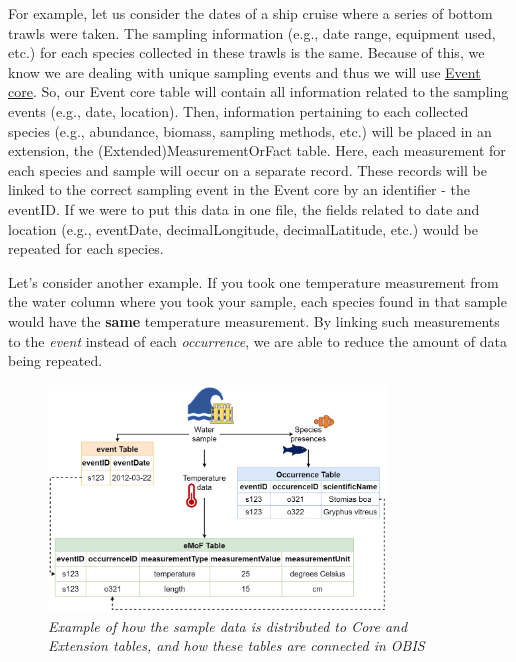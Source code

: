 \documentclass[
  letterpaper,
  DIV=11,
  numbers=noendperiod,
  oneside]{scrreprt}
\begin{document}
For example, let us consider the dates of a ship cruise where a series
of bottom trawls were taken. The sampling information (e.g., date range,
equipment used, etc.) for each species collected in these trawls is the
same. Because of this, we know we are dealing with unique sampling
events and thus we will use \href{format_event.html}{Event core}. So,
our Event core table will contain all information related to the
sampling events (e.g., date, location). Then, information pertaining to
each collected species (e.g., abundance, biomass, sampling methods,
etc.) will be placed in an extension, the (Extended)MeasurementOrFact
table. Here, each measurement for each species and sample will occur on
a separate record. These records will be linked to the correct sampling
event in the Event core by an identifier - the eventID. If we were to
put this data in one file, the fields related to date and location
(e.g., eventDate, decimalLongitude, decimalLatitude, etc.) would be
repeated for each species.

Let's consider another example. If you took one temperature measurement
from the water column where you took your sample, each species found in
that sample would have the \textbf{same} temperature measurement. By
linking such measurements to the \emph{event} instead of each
\emph{occurrence}, we are able to reduce the amount of data being
repeated.

\begin{figure}

{\centering \includegraphics[width=0.8\textwidth,height=\textheight]{images/OBIS-sampling-schema-example-update.png}

}

\caption{\emph{Example of how the sample data is distributed to Core and
Extension tables, and how these tables are connected in OBIS}}

\end{figure}
\end{document}
